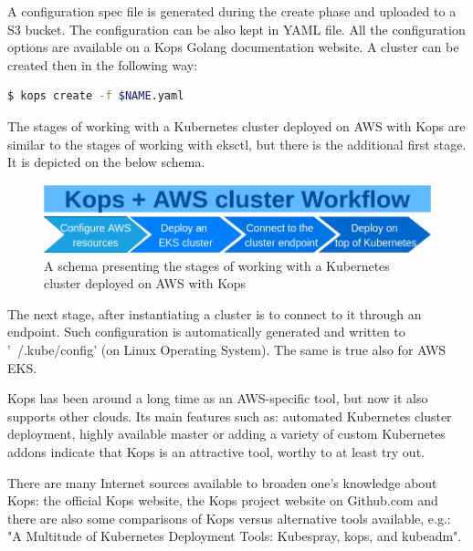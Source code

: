 A configuration spec file is generated during the create phase and uploaded to a S3 bucket. The configuration can be also kept in YAML file. All the configuration options are available on a Kops Golang documentation website\cite{online-kops-yaml-config-golang}. A cluster can be created then in the following way\cite{online-kops-yaml-config}:
\begin{lstlisting}[basicstyle=\small,caption={A command of Kops CLI tool used to create a Kubernetes cluster using a YAML configuration file},captionpos=b,language=Bash,xleftmargin=1cm]
$ kops create -f $NAME.yaml
\end{lstlisting}


The stages of working with a Kubernetes cluster deployed on AWS with Kops are similar to the stages of working with eksctl, but there is the additional first stage. It is depicted on the below schema.
\begin{figure}[H]
    \centering
    \includegraphics[width=12cm]{figures/kops-aws-workflow.png}
    \captionsetup{justification=centering,margin=2cm}
    \caption{A schema presenting the stages of working with a Kubernetes cluster deployed on AWS with Kops}
\end{figure}

The next stage, after instantiating a cluster is to connect to it through an endpoint. Such configuration is automatically generated and written to '~/.kube/config' (on Linux Operating System)\cite{online-kops-aws}. The same is true also for AWS EKS.

Kops has been around a long time as an AWS-specific tool, but now it also supports other clouds\cite{book-cndwk}\cite{online-kops-gh}. Its main features such as: automated Kubernetes cluster deployment, highly available master or adding a variety of custom Kubernetes addons\cite{kops-addons} indicate that Kops is an attractive tool, worthy to at least try out.

There are many Internet sources available to broaden one's knowledge about Kops: the official Kops website\cite{online-kops}, the Kops project website on Github.com\cite{online-kops-gh} and there are also some comparisons of Kops versus alternative tools available, e.g.: "A Multitude of Kubernetes Deployment Tools: Kubespray, kops, and kubeadm"\cite{online-kops-blog}.

